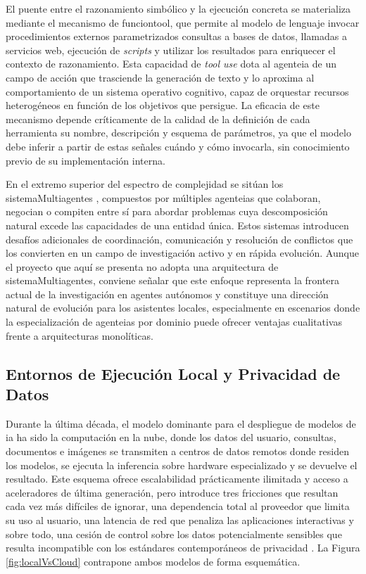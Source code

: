 El puente entre el razonamiento simbólico y la ejecución concreta se materializa mediante el mecanismo de \gls{funciontool}, que permite al modelo de lenguaje invocar procedimientos externos parametrizados consultas a bases de datos, llamadas a servicios web, ejecución de \textit{scripts} y utilizar los resultados para enriquecer el contexto de razonamiento. Esta capacidad de \textit{tool use} dota al \gls{agenteia} de un campo de acción que trasciende la generación de texto y lo aproxima al comportamiento de un sistema operativo cognitivo, capaz de orquestar recursos heterogéneos en función de los objetivos que persigue. La eficacia de este mecanismo depende críticamente de la calidad de la definición de cada herramienta su nombre, descripción y esquema de parámetros, ya que el modelo debe inferir a partir de estas señales cuándo y cómo invocarla, sin conocimiento previo de su implementación interna.

En el extremo superior del espectro de complejidad se sitúan los \glspl{sistemaMultiagente} \cite{xi2023rise}, compuestos por múltiples \glspl{agenteia} que colaboran, negocian o compiten entre sí para abordar problemas cuya descomposición natural excede las capacidades de una entidad única. Estos sistemas introducen desafíos adicionales de coordinación, comunicación y resolución de conflictos que los convierten en un campo de investigación activo y en rápida evolución. Aunque el proyecto que aquí se presenta no adopta una arquitectura de \glspl{sistemaMultiagente}, conviene señalar que este enfoque representa la frontera actual de la investigación en agentes autónomos y constituye una dirección natural de evolución para los asistentes locales, especialmente en escenarios donde la especialización de \glspl{agenteia} por dominio puede ofrecer ventajas cualitativas frente a arquitecturas monolíticas.

\subsection{Entornos de Ejecución Local y Privacidad de Datos}
\label{subsec:ejecucion-local}

Durante la última década, el modelo dominante para el despliegue de modelos de \gls{ia} ha sido la computación en la nube, donde los datos del usuario, consultas, documentos e imágenes se transmiten a centros de datos remotos donde residen los modelos, se ejecuta la inferencia sobre \gls{hardware} especializado y se devuelve el resultado. Este esquema ofrece escalabilidad prácticamente ilimitada y acceso a aceleradores de última generación, pero introduce tres fricciones que resultan cada vez más difíciles de ignorar, una dependencia total al proveedor que limita su uso al usuario, una latencia de red que penaliza las aplicaciones interactivas y sobre todo, una cesión de control sobre los datos potencialmente sensibles que resulta incompatible con los estándares contemporáneos de privacidad \cite{kleppmann2019local}. La Figura \ref{fig:localVsCloud} contrapone ambos modelos de forma esquemática.

